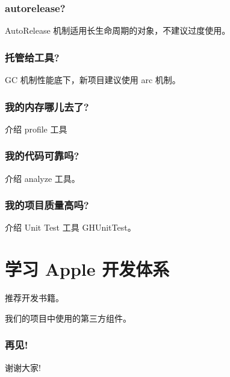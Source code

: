 \documentclass[utf8x, notes=hide]{beamer}
\begin{document}
\begin{frame}
  \frametitle{autorelease?}
AutoRelease 机制适用长生命周期的对象，不建议过度使用。
\end{frame}

\begin{frame}
  \frametitle{托管给工具?}
GC 机制性能底下，新项目建议使用 arc 机制。
\end{frame}

\begin{frame}
  \frametitle{我的内存哪儿去了?}
介绍 profile 工具
\end{frame}

\begin{frame}
  \frametitle{我的代码可靠吗?}
介绍 analyze 工具。
\end{frame}

\begin{frame}
  \frametitle{我的项目质量高吗?}
介绍 Unit Test 工具 GHUnitTest。
\end{frame}


\section{学习 Apple 开发体系}
\begin{frame}
  \begin{center}
推荐开发书籍。
  \end{center}
\end{frame}

\begin{frame}
  \begin{center}
我们的项目中使用的第三方组件。
  \end{center}
\end{frame}

\begin{frame}
  \frametitle{再见!}
  \begin{center}
    谢谢大家!\\
  \end{center}
\end{frame}
\end{document}
